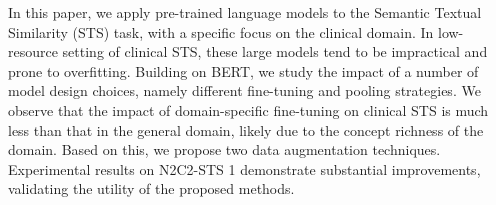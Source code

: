 In this paper, we apply pre-trained language models to the Semantic Textual Similarity (STS) task, with a specific focus on the clinical domain. In low-resource setting of clinical STS, these large models tend to be impractical and prone to overfitting. Building on BERT, we study the impact of a number of model design choices, namely different fine-tuning and pooling strategies. We observe that the impact of domain-specific fine-tuning on clinical STS is much less than that in the general domain, likely due to the concept richness of the domain. Based on this, we propose two data augmentation techniques. Experimental results on N2C2-STS 1 demonstrate substantial improvements, validating the utility of the proposed methods.
